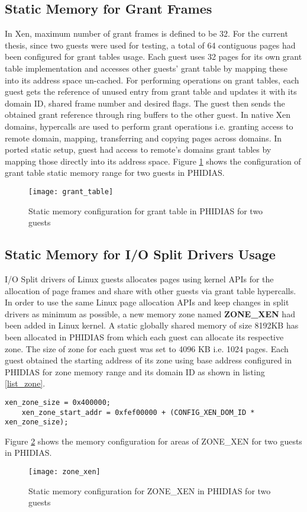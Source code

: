 \subsection{Static Memory for Grant Frames\label{sec:granttablesframes}}
In Xen, maximum number of grant frames is defined to be 32. For the current thesis, since two guests were used for testing, a total of 64 contiguous pages had been configured for grant tables usage. Each guest uses 32 pages for its own grant table implementation and accesses other guests' grant table by mapping these into its address space un-cached. For performing operations on grant tables, each guest gets the reference of unused entry from grant table and updates it with its domain ID, shared frame number and desired flags. The guest then sends the obtained grant reference through ring buffers to the other guest. In native Xen domains, hypercalls are used to perform grant operations i.e. granting access to remote domain, mapping, transferring and copying pages across domains. In ported static setup, guest had access to remote's domains grant tables by mapping those directly into its address space. Figure \ref{grant_table} shows the configuration of grant table static memory range for two guests in PHIDIAS.
\begin{figure}[!htbp]
	\centering
	\texttt{[image: grant\_table]}
	\caption{Static memory configuration for grant table in PHIDIAS for two guests}
	\label{grant_table}
\end{figure}

\subsection{Static Memory for I/O Split Drivers Usage\label{sec:splitdriverusage}}
I/O Split drivers of Linux guests allocates pages using kernel APIs for the allocation of page frames and share with other guests via grant table hypercalls. In order to use the same Linux page allocation APIs and keep changes in split drivers as minimum as possible, a new memory zone named \textbf{ZONE\_XEN} had been added in Linux kernel. A static globally shared memory of size 8192KB has been allocated in PHIDIAS from which each guest can allocate its respective zone. The size of zone for each guest was set to 4096 KB i.e. 1024 pages. Each guest obtained the starting address of its zone using base address configured in PHIDIAS for zone memory range and its domain ID as shown in listing \ref{list_zone}.
\\
\begin{lstlisting}[caption=Code snippet for calculating start address of guest ZONE\_XEN, label={list_zone}]
    xen_zone_size = 0x400000;
    xen_zone_start_addr = 0xfef00000 + (CONFIG_XEN_DOM_ID * xen_zone_size);

\end{lstlisting}
Figure \ref{zone_xen} shows the memory configuration for areas of ZONE\_XEN for two guests in PHIDIAS.
\begin{figure}[!htbp]
	\centering
	\texttt{[image: zone\_xen]}
	\caption{Static memory configuration for ZONE\_XEN in PHIDIAS for two guests}
	\label{zone_xen}
\end{figure}

